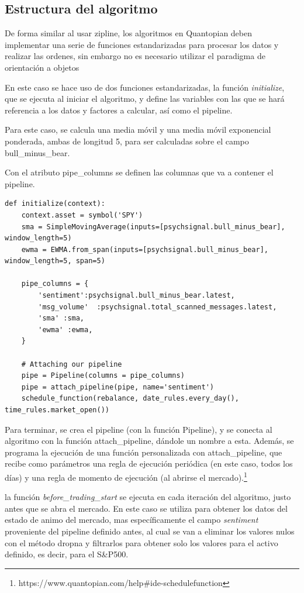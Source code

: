\documentclass[a4paper, 11pt, twocolumn]{article}
\begin{document}
\subsection{Estructura del algoritmo}
De forma similar al usar zipline, los algoritmos en Quantopian deben implementar una serie de funciones estandarizadas para procesar los datos y realizar las ordenes, sin embargo no es necesario utilizar el paradigma de orientación a objetos

En este caso se hace uso de dos funciones estandarizadas, la función \textit{initialize}, que se ejecuta al iniciar el algoritmo, y define las variables con las que se hará referencia a los datos y factores a calcular, así como el pipeline.

Para este caso, se calcula una media móvil y una media móvil exponencial ponderada, ambas de longitud 5, para ser calculadas sobre el campo bull\_minus\_bear.

Con el atributo pipe\_columns se definen las columnas que va a contener el pipeline.

\begin{lstlisting}
def initialize(context):
    context.asset = symbol('SPY')
    sma = SimpleMovingAverage(inputs=[psychsignal.bull_minus_bear], window_length=5)
    ewma = EWMA.from_span(inputs=[psychsignal.bull_minus_bear], window_length=5, span=5)
    
    pipe_columns = {
        'sentiment':psychsignal.bull_minus_bear.latest,
        'msg_volume'  :psychsignal.total_scanned_messages.latest,
        'sma' :sma,
        'ewma' :ewma,
    }
    
    # Attaching our pipeline
    pipe = Pipeline(columns = pipe_columns)
    pipe = attach_pipeline(pipe, name='sentiment')
    schedule_function(rebalance, date_rules.every_day(), time_rules.market_open())
\end{lstlisting}

Para terminar, se crea el pipeline (con la función Pipeline), y se conecta al algoritmo con la función attach\_pipeline, dándole un nombre a esta. Además, se programa la ejecución de una función personalizada con attach\_pipeline, que recibe como parámetros una regla de ejecución periódica (en este caso, todos los días) y una regla de momento de ejecución (al abrirse el mercado).\footnote{https://www.quantopian.com/help\#ide-schedulefunction}

la función \textit{before\_trading\_start} se ejecuta en cada iteración del algoritmo, justo antes que se abra el mercado. En este caso se utiliza para obtener los datos del estado de animo del mercado, mas específicamente el campo \textit{sentiment} proveniente del pipeline definido antes, al cual se van a eliminar los valores nulos con el método dropna y filtrarlos para obtener solo los valores para el activo definido, es decir, para el S\&P500. 
\end{document}
